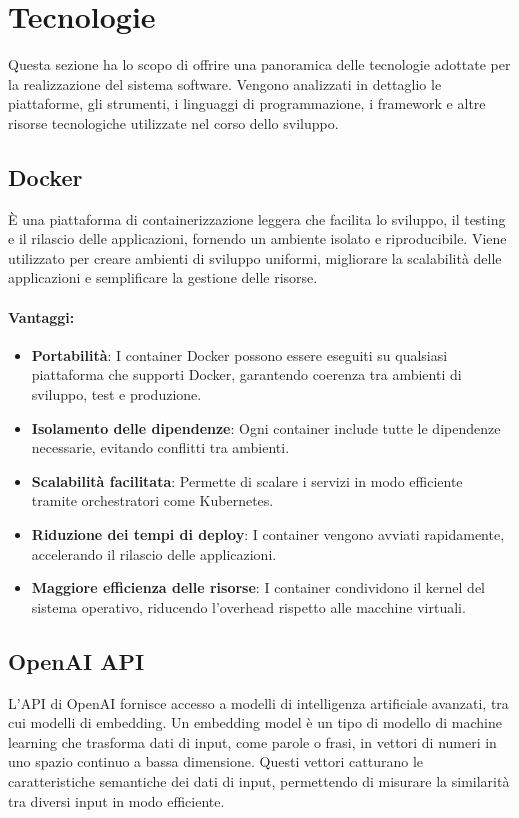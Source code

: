 \section{Tecnologie}
Questa sezione ha lo scopo di offrire una panoramica delle tecnologie adottate per la realizzazione del sistema software. Vengono analizzati in dettaglio le piattaforme, gli strumenti, i linguaggi di programmazione, i framework e altre risorse tecnologiche utilizzate nel corso dello sviluppo.


\subsection{Docker} 
È una piattaforma di containerizzazione leggera che facilita lo sviluppo, il testing e il rilascio delle applicazioni, fornendo un ambiente isolato e riproducibile. 
Viene utilizzato per creare ambienti di sviluppo uniformi, migliorare la scalabilità delle applicazioni e semplificare la gestione delle risorse. 

\paragraph{Vantaggi:} 
\begin{itemize} 
    \item \textbf{Portabilità}: I container Docker possono essere eseguiti su qualsiasi piattaforma che supporti Docker, garantendo coerenza tra ambienti di sviluppo, test e produzione. 
    \item \textbf{Isolamento delle dipendenze}: Ogni container include tutte le dipendenze necessarie, evitando conflitti tra ambienti. 
    \item \textbf{Scalabilità facilitata}: Permette di scalare i servizi in modo efficiente tramite orchestratori come Kubernetes. 
    \item \textbf{Riduzione dei tempi di deploy}: I container vengono avviati rapidamente, accelerando il rilascio delle applicazioni. 
    \item \textbf{Maggiore efficienza delle risorse}: I container condividono il kernel del sistema operativo, riducendo l'overhead rispetto alle macchine virtuali. 
\end{itemize} 


\subsection{OpenAI API}
L'API di OpenAI fornisce accesso a modelli di intelligenza artificiale avanzati, tra cui modelli di embedding. Un embedding model è un tipo di modello di machine learning che trasforma dati di input, come parole o frasi, in vettori di numeri in uno spazio continuo a bassa dimensione. Questi vettori catturano le caratteristiche semantiche dei dati di input, permettendo di misurare la similarità tra diversi input in modo efficiente.
